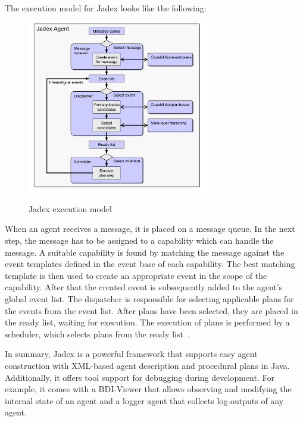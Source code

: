 The execution model for Jadex looks like the following:
\begin{figure}
	\centering
	\includegraphics[width=300px]{images/Jadex_execution_model.png}
	\label{fig4}
	\caption{Jadex execution model \cite{pokahr_jadex_2005}}
\end{figure}
\newline
When an agent receives a message, it is placed on a message queue.
In the next step, the message has to be assigned to a capability which can handle the message.
A suitable capability is found by matching the message against the event templates defined in the event base of each capability.
The best matching template is then used to create an appropriate event in the scope of the capability.
After that the created event is subsequently added to the agent's global event list.
The dispatcher is responsible for selecting applicable plans for the events from the event list.
After plans have been selected, they are placed in the ready list, waiting for execution.
The execution of plans is performed by a scheduler, which selects plans from the ready list~\cite{pokahr_jadex_2005}.

In summary, Jadex is a powerful framework that supports easy agent construction with XML-based agent description and procedural plans in Java.
Additionally, it offers tool support for debugging during development.
For example, it comes with a BDI-Viewer that allows observing and modifying the internal state of an agent and a logger agent that collects log-outputs of any agent.
